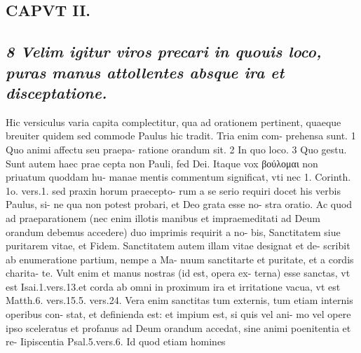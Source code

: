 \documentclass{article}
\begin{document}
\begin{pages}
\section*{CAPVT II. }
\marginpar{[ p.65 ]}
{}
\subsection*{\textit{8 Velim igitur viros precari in quouis loco, puras manus attollentes absque ira et disceptatione. }}\pstart Hic versiculus varia capita complectitur, qua ad orationem pertinent, quaeque breuiter quidem sed commode Paulus hic tradit. Tria enim com- prehensa sunt. 1 Quo animi affectu seu praepa- ratione orandum sit. 2 In quo loco. 3 Quo gestu.  \pend\pstart Sunt autem haec prae cepta non Pauli, fed Dei. Itaque vox βούλομαι non priuatum quoddam hu- manae mentis commentum significat, vti nec 1. Corinth. 1o. vers.1. sed praxin horum praecepto- rum a se serio requiri docet his verbis Paulus, si- ne qua non potest probari, et Deo grata esse no- stra oratio.  \pend\pstart Ac quod ad praeparationem (nec enim illotis manibus et impraemeditati ad Deum orandum debemus accedere) duo imprimis requirit a no- bis, Sanctitatem siue puritarem vitae, et Fidem.  \pend\pstart Sanctitatem autem illam vitae designat et de- scribit ab enumeratione partium, nempe a Ma- nuum sanctitarte et puritate, et a cordis charita- te. Vult enim et manus nostras (id est, opera ex- terna) esse sanctas, vt est Isai.1.vers.13.et corda ab omni in proximum ira et irritatione vacua, vt est Matth.6. vers.15.5. vers.24. Vera enim sanctitas tum externis, tum etiam internis operibus con- stat, et definienda est: et impium est, si quis vel ani- mo vel opere ipso sceleratus et profanus ad Deum orandum accedat, sine animi poenitentia et re- Iipiscentia Psal.5.vers.6. Id quod etiam homines  \pend

\end{pages}
\end{document}
